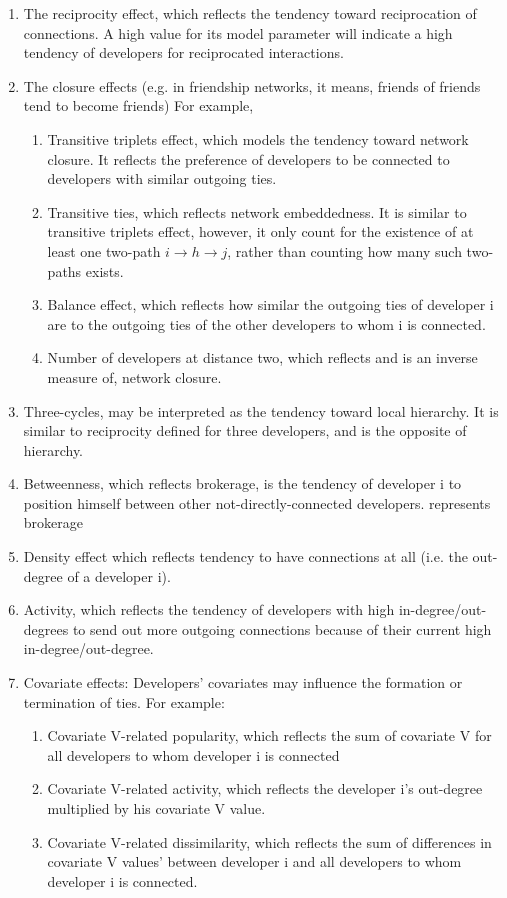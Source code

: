 \documentclass[11pt]{report}
\begin{document}
\begin{enumerate}
\item{The reciprocity effect, which reflects the tendency toward reciprocation of connections. A high value for its model parameter will indicate a high tendency of developers for reciprocated interactions.}
\item{The closure effects (e.g. in friendship networks, it means, friends of friends tend to become friends)}
For example, 
\begin{enumerate}
\item Transitive triplets effect, which models the tendency toward network closure. It reflects the preference of developers to be connected to developers with similar outgoing ties.  
\item Transitive ties, which reflects network embeddedness. It is similar to transitive triplets effect, however, it only count for the existence of at least one two-path  $i \rightarrow h \rightarrow j$, rather than counting how many such two-paths exists.  
\item Balance effect, which reflects how similar the outgoing ties of developer i are to the outgoing ties of the other developers to whom i is connected. 
\item Number of developers at distance two, which reflects and is an inverse measure of, network closure. 
\end{enumerate}
\item{Three-cycles, may be interpreted as the tendency toward local hierarchy. It is similar to reciprocity defined for three developers, and is the opposite of hierarchy.}
\item{Betweenness, which reflects brokerage, is the tendency of developer i to position himself between other not-directly-connected developers.}
represents brokerage
\item{Density effect which reflects tendency to have connections at all (i.e. the out-degree of a developer i).      }
\item{Activity, which reflects the tendency of developers with high in-degree/out-degrees to send out more outgoing connections because of their current high in-degree/out-degree.}
\item Covariate effects: Developers' covariates may influence the formation or termination of ties. For example:
\begin{enumerate}
\item{Covariate V-related popularity, which reflects the sum of covariate V for all developers to whom developer i is connected}
\item{Covariate V-related activity, which reflects the developer i's out-degree multiplied by his covariate V value.}
\item{Covariate V-related dissimilarity, which reflects the sum of differences in covariate V values' between developer i and all developers to whom developer i is connected.}


\end{enumerate}
\end{enumerate}
\end{document}
